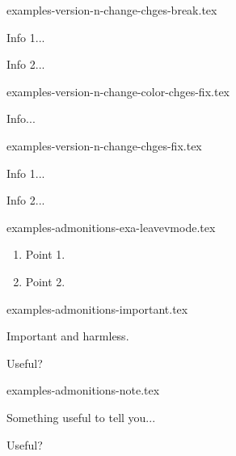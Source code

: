\begin{filecontents*}[overwrite]{examples-version-n-change-chges-break.tex}
\begin{tdocbreak}
    \item Info 1...
    \item Info 2...
\end{tdocbreak}
\end{filecontents*}


\begin{filecontents*}[overwrite]{examples-version-n-change-color-chges-fix.tex}
\begin{tdocfix}[col = CadetBlue]
    \item Info...
\end{tdocfix}
\end{filecontents*}


\begin{filecontents*}[overwrite]{examples-version-n-change-chges-fix.tex}
\begin{tdocfix}
    \item Info 1...
    \item Info 2...
\end{tdocfix}
\end{filecontents*}


\begin{filecontents*}[overwrite]{examples-admonitions-exa-leavevmode.tex}
\begin{tdocexa}
    \leavevmode
    \begin{enumerate}
        \item Point 1.

        \item Point 2.
    \end{enumerate}
\end{tdocexa}
\end{filecontents*}


\begin{filecontents*}[overwrite]{examples-admonitions-important.tex}
\begin{tdocimp}
    Important and harmless.
\end{tdocimp}

\begin{tdocimp}
    Useful?
\end{tdocimp}
\end{filecontents*}


\begin{filecontents*}[overwrite]{examples-admonitions-note.tex}
\begin{tdocnote}
    Something useful to tell you...
\end{tdocnote}

\begin{tdocnote}
    Useful?
\end{tdocnote}
\end{filecontents*}


